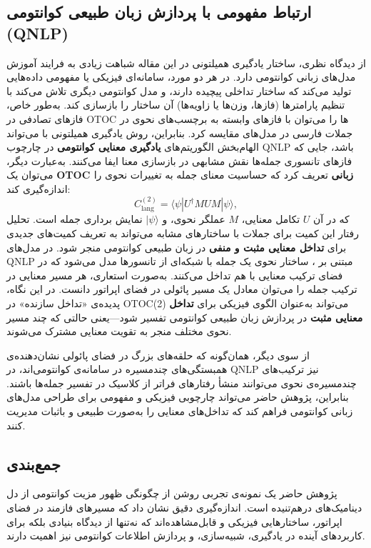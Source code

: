 \subsection{ارتباط مفهومی با پردازش زبان طبیعی کوانتومی (QNLP)}

از دیدگاه نظری، ساختار یادگیری همیلتونی در این مقاله شباهت زیادی به فرایند آموزش مدل‌های زبانی کوانتومی دارد.  
در هر دو مورد، سامانه‌ای فیزیکی یا مفهومی داده‌هایی تولید می‌کند که ساختار تداخلی پیچیده دارند، و مدل کوانتومی دیگری تلاش می‌کند با تنظیم پارامترها (فازها، وزن‌ها یا زاویه‌ها) آن ساختار را بازسازی کند.  
به‌طور خاص، فازهای تصادفی در OTOC ها را می‌توان با فازهای وابسته به برچسب‌های نحوی در جملات فارسی در مدل‌های  مقایسه کرد.  
بنابراین، روش یادگیری همیلتونی با  می‌تواند الهام‌بخش الگوریتم‌های \textbf{یادگیری معنایی کوانتومی} در چارچوب QNLP باشد، جایی که فازهای تانسوری جمله‌ها نقش مشابهی در بازسازی معنا ایفا می‌کنند.
به‌عبارت دیگر، می‌توان یک \textbf{OTOC زبانی} تعریف کرد که حساسیت معنای جمله به تغییرات نحوی را اندازه‌گیری کند:
\[
C^{(2)}_{\text{lang}} = \langle \psi | U^\dagger M U M | \psi \rangle,
\]
که در آن \(U\) تکامل معنایی، \(M\) عملگر نحوی، و \(|\psi\rangle\) نمایش برداری جمله است.  
تحلیل رفتار این کمیت برای جملات با ساختارهای مشابه می‌تواند به تعریف کمیت‌های جدیدی برای \textbf{تداخل معنایی مثبت و منفی} در زبان طبیعی کوانتومی منجر شود.
در مدل‌های QNLP مبتنی بر ، ساختار نحوی یک جمله با شبکه‌ای از تانسورها مدل می‌شود که در فضای ترکیب معنایی با هم تداخل می‌کنند.  
به‌صورت استعاری، هر مسیر معنایی در ترکیب جمله را می‌توان معادل یک مسیر پائولی در فضای اپراتور دانست.  
در این نگاه، پدیده‌ی «تداخل سازنده» در OTOC(2) می‌تواند به‌عنوان الگوی فیزیکی برای \textbf{تداخل معنایی مثبت} در پردازش زبان طبیعی کوانتومی تفسیر شود—یعنی حالتی که چند مسیر نحوی مختلف منجر به تقویت معنایی مشترک می‌شوند.

از سوی دیگر، همان‌گونه که حلقه‌های بزرگ در فضای پائولی نشان‌دهنده‌ی همبستگی‌های چندمسیره در سامانه‌ی کوانتومی‌اند، در QNLP نیز ترکیب‌های چندمسیره‌ی نحوی می‌توانند منشأ رفتارهای فراتر از کلاسیک در تفسیر جمله‌ها باشند.  
بنابراین، پژوهش حاضر می‌تواند چارچوبی فیزیکی و مفهومی برای طراحی مدل‌های زبانی کوانتومی فراهم کند که تداخل‌های معنایی را به‌صورت طبیعی و باثبات مدیریت کنند.

\subsection{جمع‌بندی }

پژوهش حاضر یک نمونه‌ی تجربی روشن از چگونگی ظهور مزیت کوانتومی از دل دینامیک‌های درهم‌تنیده است.  
اندازه‌گیری دقیق  نشان داد که مسیرهای فازمند در فضای اپراتور، ساختارهایی فیزیکی و قابل‌مشاهده‌اند که نه‌تنها از دیدگاه بنیادی بلکه برای کاربردهای آینده در یادگیری، شبیه‌سازی، و پردازش اطلاعات کوانتومی نیز اهمیت دارند.

